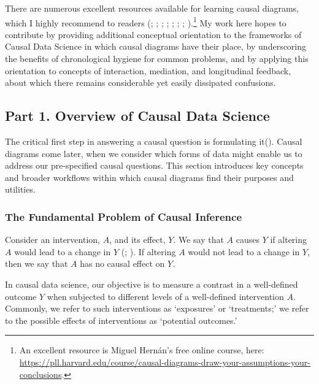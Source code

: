 \documentclass[
  singlecolumn,
  9pt]{article}
\begin{document}
There are numerous excellent resources available for learning causal
diagrams, which I highly recommend to readers
(;
;
;
;
;
; ; ).\footnote{An excellent resource is Miguel Hernán's free online
  course, here:
  \url{https://pll.harvard.edu/course/causal-diagrams-draw-your-assumptions-your-conclusions}.}
My work here hopes to contribute by providing additional conceptual
orientation to the frameworks of Causal Data Science in which causal
diagrams have their place, by underscoring the benefits of chronological
hygiene for common problems, and by applying this orientation to
concepts of interaction, mediation, and longitudinal feedback, about
which there remains considerable yet easily dissipated confusions.

\subsection{Part 1. Overview of Causal Data
Science}\label{part-1.-overview-of-causal-data-science}

The critical first step in answering a causal question is formulating
it(). Causal
diagrams come later, when we consider which forms of data might enable
us to address our pre-specified causal questions. This section
introduces key concepts and broader workflows within which causal
diagrams find their purposes and utilities.

\subsubsection{The Fundamental Problem of Causal
Inference}\label{the-fundamental-problem-of-causal-inference}

Consider an intervention, \(A\), and its effect, \(Y\). We say that
\(A\) causes \(Y\) if altering \(A\) would lead to a change in \(Y\)
(; ). If altering \(A\) would not lead to a change in \(Y\), then we
say that \(A\) has no causal effect on \(Y\).

In causal data science, our objective is to measure a contrast in a
well-defined outcome \(Y\) when subjected to different levels of a
well-defined intervention \(A\). Commonly, we refer to such
interventions as `exposures' or `treatments;' we refer to the possible
effects of interventions as `potential outcomes.'
\end{document}
